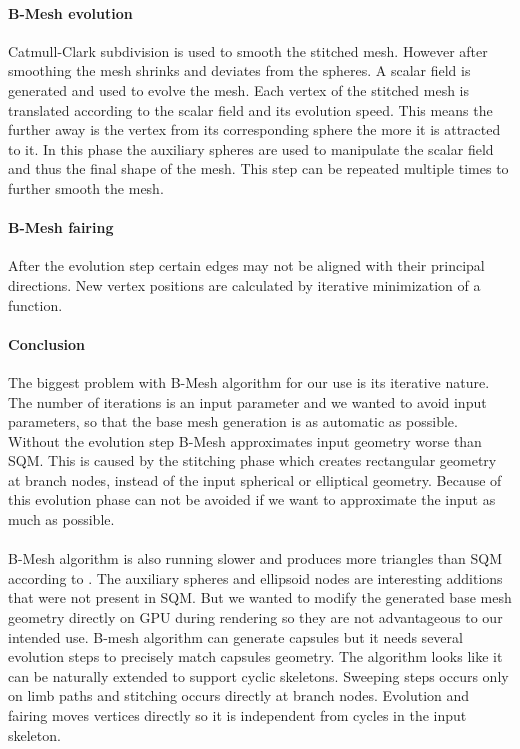 \paragraph{B-Mesh evolution}
Catmull-Clark subdivision is used to smooth the stitched mesh. However after smoothing the mesh shrinks and deviates from the spheres. A scalar field is generated and used to evolve the mesh. Each vertex of the stitched mesh is translated according to the scalar field and its evolution speed. This means the further away is the vertex from its corresponding sphere the more it is attracted to it. In this phase the auxiliary spheres are used to manipulate the scalar field and thus the final shape of the mesh. This step can be repeated multiple times to further smooth the mesh.

\paragraph{B-Mesh fairing}
After the evolution step certain edges may not be aligned with their principal directions. New vertex positions are calculated by iterative minimization of a function.

\paragraph{Conclusion}
The biggest problem with B-Mesh algorithm for our use is its iterative nature. The number of iterations is an input parameter and we wanted to avoid input parameters, so that the base mesh generation is as automatic as possible. Without the evolution step B-Mesh approximates input geometry worse than SQM. This is caused by the stitching phase which creates rectangular geometry at branch nodes, instead of the input spherical or elliptical geometry. Because of this evolution phase can not be avoided if we want to approximate the input as much as possible.
\paragraph{}
B-Mesh algorithm is also running slower and produces more triangles than SQM according to \cite{sqm}. The auxiliary spheres and ellipsoid nodes are interesting additions that were not present in SQM. But we wanted to modify the generated base mesh geometry directly on GPU during rendering so they are not advantageous to our intended use. B-mesh algorithm can generate capsules but it needs several evolution steps to precisely match capsules geometry. The algorithm looks like it can be naturally extended to support cyclic skeletons. Sweeping steps occurs only on limb paths and stitching occurs directly at branch nodes. Evolution and fairing moves vertices directly so it is independent from cycles in the input skeleton.

